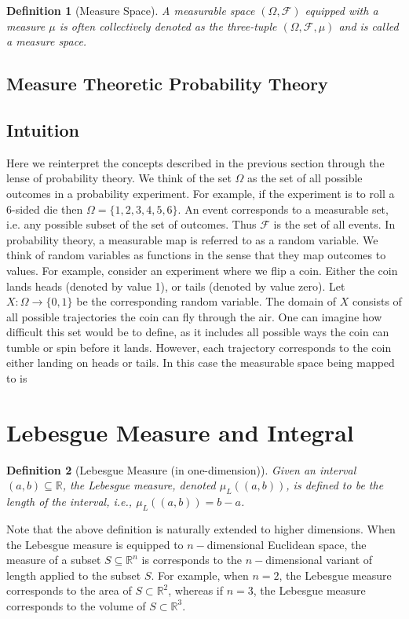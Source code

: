 \documentclass[10pt, oneside]{article}
\newcommand{\R}{\mathbb{R}}
\newtheorem{defn}{Definition}
\begin{document}
\begin{defn}[Measure Space]
    \label{defn:measure-space}
    A measurable space $(\Omega,\mathcal{F})$ equipped with a measure $\mu$ is often 
    collectively denoted as the three-tuple $(\Omega,\mathcal{F},\mu)$ and is called 
    a measure space. 
\end{defn}

\subsection{Measure Theoretic Probability Theory}

\subsection{Intuition}
Here we reinterpret the concepts described in the previous section through the lense of probability theory.
We think of the set $\Omega$ as the set of all possible outcomes in a probability experiment. For example, if the experiment is to roll a 6-sided die then $\Omega=\{1,2,3,4,5,6\}$.
An event corresponds to a measurable set, i.e. any possible subset of the set of outcomes.
Thus $\mathcal{F}$ is the set of all events.
In probability theory, a measurable map is referred to as a random variable.
We think of random variables as functions in the sense that they map outcomes to values.
For example, consider an experiment where we flip a coin. 
Either the coin lands heads (denoted by value 1), or tails (denoted by value zero). 
Let $X:\Omega\to\{0,1\}$ be the corresponding random variable.
The domain of $X$ consists of all possible trajectories the coin can fly through the air. One can imagine how difficult this set would be to define, as it includes all possible ways the coin can tumble or spin before it lands.
However, each trajectory corresponds to the coin either landing on heads or tails.
In this case the measurable space being mapped to is 

\section{Lebesgue Measure and Integral}
\label{sec:lebesgue}
\begin{defn}[Lebesgue Measure (in one-dimension)]
    Given an interval $(a,b) \subseteq \R$, the Lebesgue measure, denoted $\mu_L((a,b))$, 
    is defined to be the length of the interval, i.e., $\mu_L((a,b)) = b-a$. 
\end{defn}
Note that the above definition is naturally extended to higher dimensions. When the 
Lebesgue measure is equipped to $n-$dimensional Euclidean space, the measure of a subset 
$S \subseteq \R^{n}$ is corresponds to the $n-$dimensional variant of length applied to 
the subset $S$. For example, when $n=2$, the Lebesgue measure corresponds to the area of 
$S \subset \R^2$, whereas if $n=3$, the Lebesgue measure corresponds to the volume of $S
\subset \R^3$. 
\end{document}
